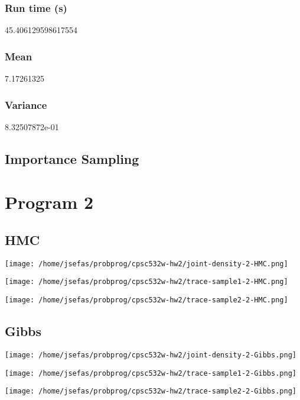 \documentclass[11pt]{article}
\begin{document}
\subsubsection*{Run time (s)}
\label{sec:org7afc4ba}
45.406129598617554
\subsubsection*{Mean}
\label{sec:orgee4eac0}
7.17261325
\subsubsection*{Variance}
\label{sec:org8bedf3d}
8.32507872e-01

\subsection*{Importance Sampling}
\label{sec:org1b0162c}

\section*{Program 2}
\label{sec:orgb0baa64}
\subsection*{HMC}
\label{sec:org8315ec3}
\begin{center}
\texttt{[image: /home/jsefas/probprog/cpsc532w-hw2/joint-density-2-HMC.png]}
\end{center}
\begin{center}
\texttt{[image: /home/jsefas/probprog/cpsc532w-hw2/trace-sample1-2-HMC.png]}
\end{center}
\begin{center}
\texttt{[image: /home/jsefas/probprog/cpsc532w-hw2/trace-sample2-2-HMC.png]}
\end{center}

\subsection*{Gibbs}
\label{sec:orgbf3d050}
\begin{center}
\texttt{[image: /home/jsefas/probprog/cpsc532w-hw2/joint-density-2-Gibbs.png]}
\end{center}
\begin{center}
\texttt{[image: /home/jsefas/probprog/cpsc532w-hw2/trace-sample1-2-Gibbs.png]}
\end{center}
\begin{center}
\texttt{[image: /home/jsefas/probprog/cpsc532w-hw2/trace-sample2-2-Gibbs.png]}
\end{center}
\end{document}
